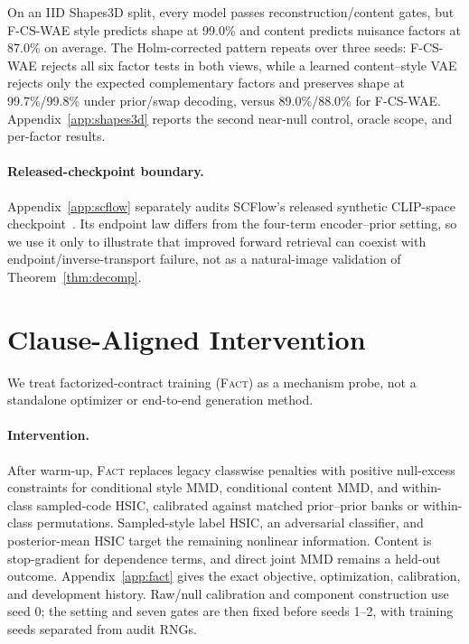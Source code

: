 \documentclass{article}
\newcommand{\FACT}{\textsc{Fact}}
\begin{document}
On an IID Shapes3D split, every model passes reconstruction/content gates, but
F-CS-WAE style predicts shape at 99.0\% and content predicts nuisance factors
at 87.0\% on average.  The Holm-corrected pattern repeats over three seeds:
F-CS-WAE rejects all six factor tests in both views, while a learned
content--style VAE rejects only the expected complementary factors and
preserves shape at 99.7\%/99.8\% under prior/swap decoding, versus
89.0\%/88.0\% for F-CS-WAE.  Appendix~\ref{app:shapes3d} reports the second
near-null control, oracle scope, and per-factor results.

\paragraph{Released-checkpoint boundary.}
Appendix~\ref{app:scflow} separately audits SCFlow's released synthetic
CLIP-space checkpoint~\citep{ma2025scflow}.  Its endpoint law differs from the
four-term encoder--prior setting, so we use it only to illustrate that improved
forward retrieval can coexist with endpoint/inverse-transport failure, not as
a natural-image validation of Theorem~\ref{thm:decomp}.

\section{Clause-Aligned Intervention}
\label{sec:fact-results}

We treat factorized-contract training (\FACT{}) as a mechanism probe, not a
standalone optimizer or end-to-end generation method.

\paragraph{Intervention.}
After warm-up, \FACT{} replaces legacy classwise penalties with positive
null-excess constraints for conditional style MMD, conditional content MMD,
and within-class sampled-code HSIC, calibrated against matched prior--prior
banks or within-class permutations.  Sampled-style label HSIC, an adversarial
classifier, and posterior-mean HSIC target the remaining nonlinear information.
Content is stop-gradient for dependence terms, and direct joint MMD remains a
held-out outcome.  Appendix~\ref{app:fact} gives the exact objective,
optimization, calibration, and development history.  Raw/null calibration and
component construction use seed 0; the setting and seven gates are then fixed
before seeds 1--2, with training seeds separated from audit RNGs.
\end{document}
